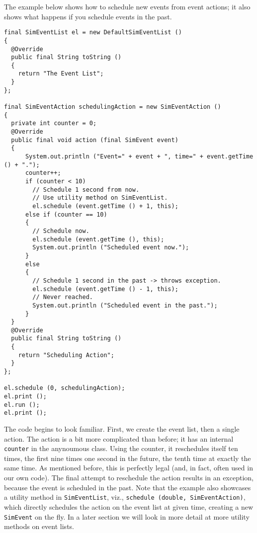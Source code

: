 \documentclass[12pt]{book}
\begin{document}
The example below shows how to schedule new events
  from event actions; it also shows what happens if you schedule
  events in the past.
\begin{lstlisting}[basicstyle=\tiny]
final SimEventList el = new DefaultSimEventList ()
{
  @Override
  public final String toString ()
  {
    return "The Event List";
  } 
};

final SimEventAction schedulingAction = new SimEventAction ()
{
  private int counter = 0;
  @Override
  public final void action (final SimEvent event)
  {
      System.out.println ("Event=" + event + ", time=" + event.getTime () + ".");
      counter++;
      if (counter < 10)
        // Schedule 1 second from now.
        // Use utility method on SimEventList.
        el.schedule (event.getTime () + 1, this);
      else if (counter == 10)
      {
        // Schedule now.
        el.schedule (event.getTime (), this);
        System.out.println ("Scheduled event now.");
      }
      else
      {
        // Schedule 1 second in the past -> throws exception.
        el.schedule (event.getTime () - 1, this);
        // Never reached.
        System.out.println ("Scheduled event in the past.");
      }
  }
  @Override
  public final String toString ()
  {
    return "Scheduling Action";
  }
};
    
el.schedule (0, schedulingAction);
el.print ();
el.run ();
el.print ();
\end{lstlisting}
The code begins to look familiar.
First, we create the event list, then a single action.
The action is a bit more complicated than before;
  it has an internal \lstinline{counter} in the anynoumous class.
Using the counter, it reschedules itself ten times,
  the first nine times one second in the future,
  the tenth time at exactly the same time.
As mentioned before, this is perfectly legal
  (and, in fact, often used in our own code).
The final attempt to reschedule the action results in an
  exception, because the event is scheduled in the past.
Note that the example also showcases a utility method
  in \lstinline{SimEventList}, viz., \lstinline{schedule (double, SimEventAction)},
  which directly schedules the action on the event list at given time,
  creating a new \lstinline{SimEvent} on the fly.
In a later section we will look in more detail at more utility methods
  on event lists.
\end{document}
